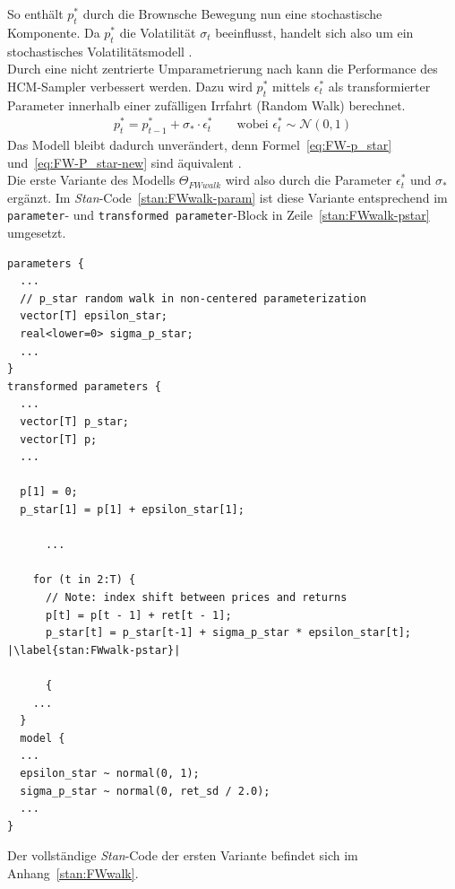 \documentclass[ngerman]{ttlab-qualify}
\begin{document}
So enthält $p_t^*$ durch die Brownsche Bewegung nun eine stochastische Komponente. Da $p_t^*$ die Volatilität $\sigma_t$ beeinflusst, handelt sich also um ein stochastisches Volatilitätsmodell \parencite{bertschinger:2018, FW:2011}.\\ 

Durch eine nicht zentrierte Umparametrierung nach \parencite{bertschinger:2018} kann die Performance des HCM-Sampler verbessert werden. Dazu wird $p_t^*$ mittels $\epsilon_t^*$ als transformierter Parameter innerhalb einer zufälligen Irrfahrt (Random Walk) berechnet.
\begin{align}
\label{eq:FW-P_star-new}
p_t^* = p_{t-1}^*+\sigma_*\cdot\epsilon_t^* &&\text{ wobei }\epsilon_t^*\sim \mathcal{N}(0,1)
\end{align}
Das Modell bleibt dadurch unverändert, denn Formel~\ref{eq:FW-p_star} und~\ref{eq:FW-P_star-new} sind äquivalent \parencite{bertschinger:2018}.\\

Die erste Variante des Modells $\Theta_{FWwalk}$ wird also durch die Parameter $\epsilon_t^*$ und $\sigma_*$ ergänzt. Im \textit{Stan}-Code~\ref{stan:FWwalk-param} ist diese Variante entsprechend im \verb|parameter|- und \verb|transformed parameter|-Block in Zeile~\ref{stan:FWwalk-pstar} umgesetzt.

\begin{lstlisting}[style=custom, escapechar=|,caption={Teil-Modell(Random Walk) nach \parencite{bertschinger:2018, FW:2011}},label={stan:FWwalk-param}]
parameters {
  ...
  // p_star random walk in non-centered parameterization
  vector[T] epsilon_star;
  real<lower=0> sigma_p_star;
  ...
}
transformed parameters {
  ...
  vector[T] p_star;
  vector[T] p;
  ...

  p[1] = 0; 
  p_star[1] = p[1] + epsilon_star[1]; 

      ...

    for (t in 2:T) {
      // Note: index shift between prices and returns
      p[t] = p[t - 1] + ret[t - 1];
      p_star[t] = p_star[t-1] + sigma_p_star * epsilon_star[t]; |\label{stan:FWwalk-pstar}|     

      {
	...
  }
  model {
  ...
  epsilon_star ~ normal(0, 1);
  sigma_p_star ~ normal(0, ret_sd / 2.0);
  ...
}
\end{lstlisting}

Der vollständige \textit{Stan}-Code der ersten Variante befindet sich im Anhang~\ref{stan:FWwalk}.\\
\end{document}
